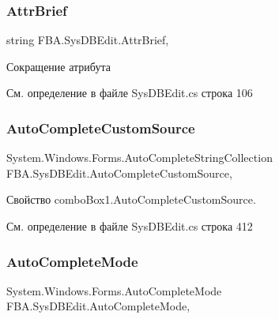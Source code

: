 \subsubsection{\texorpdfstring{Attr\+Brief}{AttrBrief}}
{\footnotesize\ttfamily string F\+B\+A.\+Sys\+D\+B\+Edit.\+Attr\+Brief\hspace{0.3cm}{\ttfamily [get]}, {\ttfamily [set]}}



Сокращение атрибута 



См. определение в файле Sys\+D\+B\+Edit.\+cs строка 106

\mbox{\label{class_f_b_a_1_1_sys_d_b_edit_af7911aeab68cb2446e182a21e8bb1b18}} 
\subsubsection{\texorpdfstring{Auto\+Complete\+Custom\+Source}{AutoCompleteCustomSource}}
{\footnotesize\ttfamily System.\+Windows.\+Forms.\+Auto\+Complete\+String\+Collection F\+B\+A.\+Sys\+D\+B\+Edit.\+Auto\+Complete\+Custom\+Source\hspace{0.3cm}{\ttfamily [get]}, {\ttfamily [set]}}



Свойство combo\+Box1.\+Auto\+Complete\+Custom\+Source. 



См. определение в файле Sys\+D\+B\+Edit.\+cs строка 412

\mbox{\label{class_f_b_a_1_1_sys_d_b_edit_ae85d47cfa67babb1396c9f3e687ea64f}} 
\subsubsection{\texorpdfstring{Auto\+Complete\+Mode}{AutoCompleteMode}}
{\footnotesize\ttfamily System.\+Windows.\+Forms.\+Auto\+Complete\+Mode F\+B\+A.\+Sys\+D\+B\+Edit.\+Auto\+Complete\+Mode\hspace{0.3cm}{\ttfamily [get]}, {\ttfamily [set]}}



